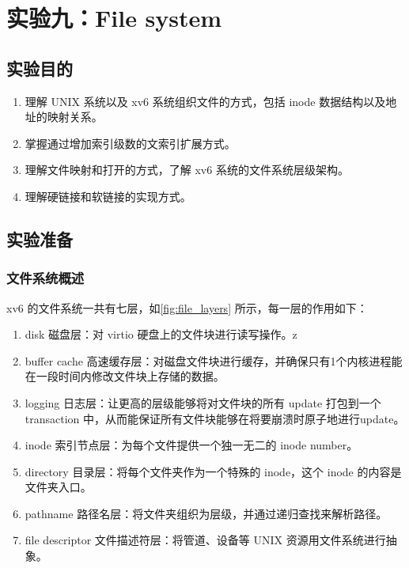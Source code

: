 \section{实验九：File system}\label{sec:File_system}

\subsection{实验目的}

\begin{enumerate}
	\item 理解 UNIX 系统以及 xv6 系统组织文件的方式，包括 inode 数据结构以及地址的映射关系。
	\item 掌握通过增加索引级数的文索引扩展方式。
	\item 理解文件映射和打开的方式，了解 xv6 系统的文件系统层级架构。
	\item 理解硬链接和软链接的实现方式。
\end{enumerate}

\subsection{实验准备}

\subsubsection{文件系统概述}

xv6 的文件系统一共有七层，如\cref{fig:file_layers} 所示，每一层的作用如下：

\begin{enumerate}
	\item disk 磁盘层：对 virtio 硬盘上的文件块进行读写操作。z
	\item buffer cache 高速缓存层：对磁盘文件块进行缓存，并确保只有1个内核进程能在一段时间内修改文件块上存储的数据。
	\item logging 日志层：让更高的层级能够将对文件块的所有 update 打包到一个 transaction 中，从而能保证所有文件块能够在将要崩溃时原子地进行update。
	\item inode 索引节点层：为每个文件提供一个独一无二的 inode number。
	\item directory 目录层：将每个文件夹作为一个特殊的 inode，这个 inode 的内容是文件夹入口。
	\item pathname 路径名层：将文件夹组织为层级，并通过递归查找来解析路径。
	\item file descriptor 文件描述符层：将管道、设备等 UNIX 资源用文件系统进行抽象。
\end{enumerate}

